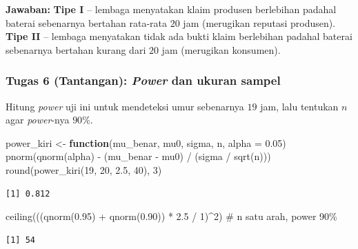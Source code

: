 \documentclass[
  indonesian,
  letterpaper,
]{book}
\newenvironment{Shaded}{\begin{snugshade}}{\end{snugshade}}
\newcommand{\AttributeTok}[1]{\textcolor[rgb]{0.40,0.45,0.13}{#1}}
\newcommand{\CommentTok}[1]{\textcolor[rgb]{0.37,0.37,0.37}{#1}}
\newcommand{\ControlFlowTok}[1]{\textcolor[rgb]{0.00,0.23,0.31}{\textbf{#1}}}
\newcommand{\DecValTok}[1]{\textcolor[rgb]{0.68,0.00,0.00}{#1}}
\newcommand{\FloatTok}[1]{\textcolor[rgb]{0.68,0.00,0.00}{#1}}
\newcommand{\FunctionTok}[1]{\textcolor[rgb]{0.28,0.35,0.67}{#1}}
\newcommand{\NormalTok}[1]{\textcolor[rgb]{0.00,0.23,0.31}{#1}}
\newcommand{\OtherTok}[1]{\textcolor[rgb]{0.00,0.23,0.31}{#1}}
\newcommand{\SpecialCharTok}[1]{\textcolor[rgb]{0.37,0.37,0.37}{#1}}
\begin{document}
\textbf{Jawaban:} \textbf{Tipe I} -- lembaga menyatakan klaim produsen
berlebihan padahal baterai sebenarnya bertahan rata-rata \(20\) jam
(merugikan reputasi produsen). \textbf{Tipe II} -- lembaga menyatakan
tidak ada bukti klaim berlebihan padahal baterai sebenarnya bertahan
kurang dari \(20\) jam (merugikan konsumen).

\subsubsection{\texorpdfstring{Tugas 6 (Tantangan): \emph{Power} dan
ukuran
sampel}{Tugas 6 (Tantangan): Power dan ukuran sampel}}\label{tugas-6-tantangan-power-dan-ukuran-sampel}

Hitung \emph{power} uji ini untuk mendeteksi umur sebenarnya \(19\) jam,
lalu tentukan \(n\) agar \emph{power}-nya \(90\%\).

\begin{Shaded}
\begin{Highlighting}[]
\NormalTok{power\_kiri }\OtherTok{\textless{}{-}} \ControlFlowTok{function}\NormalTok{(mu\_benar, mu0, sigma, n, }\AttributeTok{alpha =} \FloatTok{0.05}\NormalTok{)}
\FunctionTok{pnorm}\NormalTok{(}\FunctionTok{qnorm}\NormalTok{(alpha) }\SpecialCharTok{{-}}\NormalTok{ (mu\_benar }\SpecialCharTok{{-}}\NormalTok{ mu0) }\SpecialCharTok{/}\NormalTok{ (sigma }\SpecialCharTok{/} \FunctionTok{sqrt}\NormalTok{(n)))}
\FunctionTok{round}\NormalTok{(}\FunctionTok{power\_kiri}\NormalTok{(}\DecValTok{19}\NormalTok{, }\DecValTok{20}\NormalTok{, }\FloatTok{2.5}\NormalTok{, }\DecValTok{40}\NormalTok{), }\DecValTok{3}\NormalTok{)}
\end{Highlighting}
\end{Shaded}

\begin{verbatim}
[1] 0.812
\end{verbatim}

\begin{Shaded}
\begin{Highlighting}[]
\FunctionTok{ceiling}\NormalTok{(((}\FunctionTok{qnorm}\NormalTok{(}\FloatTok{0.95}\NormalTok{) }\SpecialCharTok{+} \FunctionTok{qnorm}\NormalTok{(}\FloatTok{0.90}\NormalTok{)) }\SpecialCharTok{*} \FloatTok{2.5} \SpecialCharTok{/} \DecValTok{1}\NormalTok{)}\SpecialCharTok{\^{}}\DecValTok{2}\NormalTok{) }\CommentTok{\# n satu arah, power 90\%}
\end{Highlighting}
\end{Shaded}

\begin{verbatim}
[1] 54
\end{verbatim}
\end{document}
